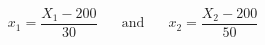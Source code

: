 

\[
x_{1} = \frac{X_{1} - 200} {30} \;\;\;\;\; \mbox{ and } \;\;\;\;\; x_{2} = \frac{X_{2} - 200}{50}

\]


